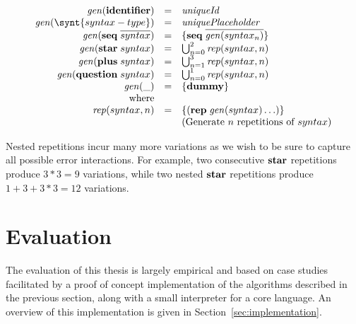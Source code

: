 \documentclass{kththesis}
\begin{document}

$$
\begin{array}{rcl}
\gen(\ident) & = & \mathit{uniqueId} \\
\gen(\synt{syntax-type}) & = & \mathit{uniquePlaceholder} \\
\gen(\seq \overline{syntax}) & = & \{\seq \overline{\gen(syntax_n)}\} \\
\gen(\repstar syntax) & = & \bigcup_{n=0}^2 \genrep(syntax, n) \\
\gen(\repplus syntax) & = & \bigcup_{n=1}^3 \genrep(syntax, n) \\
\gen(\repquestion syntax) & = & \bigcup_{n=0}^1 \genrep(syntax, n) \\
\gen(\_) & = & \{\textbf{dummy}\} \\
\text{where} & & \\
\genrep(syntax, n) & = & \{(\repseq \gen(syntax)\ldots)\} \\
& & \text{(Generate $n$ repetitions of $syntax$)} \\
\end{array}
$$

Nested repetitions incur many more variations as we wish to be sure to capture all possible error interactions. For example, two consecutive $\mathrel{\mathbf{star}}$ repetitions produce $3 * 3 = 9$ variations, while two nested $\mathrel{\mathbf{star}}$ repetitions produce $1 + 3 + 3*3 = 12$ variations.


\chapter{Evaluation} \label{sec:evaluation}

The evaluation of this thesis is largely empirical and based on case studies facilitated by a proof of concept implementation of the algorithms described in the previous section, along with a small interpreter for a core language. An overview of this implementation is given in Section~\ref{sec:implementation}.
\end{document}
